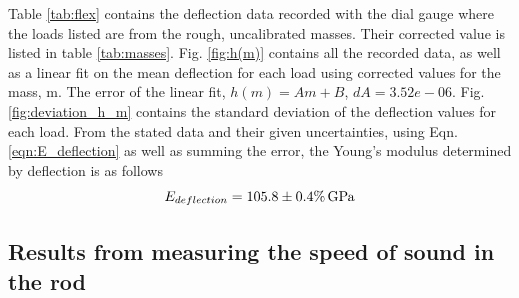 \documentclass[11pt,a4paper]{article}
\begin{document}
  Table \ref{tab:flex} contains the deflection data recorded with the dial gauge where the loads listed are from the rough, uncalibrated masses. Their corrected value is listed in table \ref{tab:masses}. 
  \newline
  \newline
  Fig. \ref{fig:h(m)} contains all the recorded data, as well as a linear fit on the mean deflection for each load using corrected values for the mass, m. The error of the linear fit, $h(m) = Am + B$, $dA = 3.52e-06$. Fig. \ref{fig:deviation_h_m} contains the standard deviation of the deflection values for each load.
  \newline
  \newline
  From the stated data and their given uncertainties, using Eqn. \ref{eqn:E_deflection} as well as summing the error, the Young's modulus determined by deflection is as follows
  \begin{equation}
    E_{deflection} = 105.8 \pm 0.4\% \, \textup{G}\textup{Pa}
  \end{equation}

  \subsection{Results from measuring the speed of sound in the rod}
\end{document}
